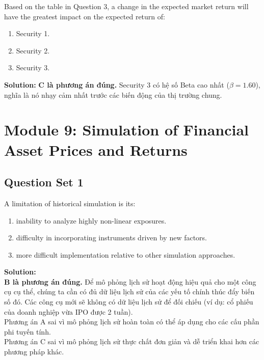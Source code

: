 \begin{tcolorbox}[
	colback=gray!5!white,
	colframe=black!15!white,
	boxrule=0.5pt,
	arc=3pt,
	title=\textbf{Question 5},
	coltitle=black,
	colbacktitle=black!5!white,
	before skip=6pt,
	after skip=6pt,
	breakable
]
Based on the table in Question 3, a change in the expected market return will have the greatest impact on the expected return of:
\begin{enumerate}[label=\Alph*.]
	\item Security 1.
	\item Security 2.
	\item Security 3.
\end{enumerate}

\textbf{Solution:}
\textbf{C là phương án đúng.} Security 3 có hệ số Beta cao nhất ($\beta = 1.60$), nghĩa là nó nhạy cảm nhất trước các biến động của thị trường chung.
\end{tcolorbox}

\newpage

\section*{Module 9: Simulation of Financial Asset Prices and Returns}

\subsection{Question Set 1}
\label{subsec:app_mod9_Question_Set_1}

\begin{tcolorbox}[
	colback=gray!5!white,
	colframe=black!15!white,
	boxrule=0.5pt,
	arc=3pt,
	title=\textbf{Question 1},
	coltitle=black,
	colbacktitle=black!5!white,
	before skip=6pt,
	after skip=6pt,
	breakable
]
A limitation of historical simulation is its:
\begin{enumerate}[label=\Alph*.]
	\item inability to analyze highly non-linear exposures.
	\item difficulty in incorporating instruments driven by new factors.
	\item more difficult implementation relative to other simulation approaches.
\end{enumerate}

\textbf{Solution:} \\
\textbf{B là phương án đúng.} Để mô phỏng lịch sử hoạt động hiệu quả cho một công cụ cụ thể, chúng ta cần có đủ dữ liệu lịch sử của các yếu tố chính thúc đẩy biến số đó. Các công cụ mới sẽ không có dữ liệu lịch sử để đối chiếu (ví dụ: cổ phiếu của doanh nghiệp vừa IPO được 2 tuần). \\
Phương án A sai vì mô phỏng lịch sử hoàn toàn có thể áp dụng cho các cấu phần phi tuyến tính. \\
Phương án C sai vì mô phỏng lịch sử thực chất đơn giản và dễ triển khai hơn các phương pháp khác.
\end{tcolorbox}

